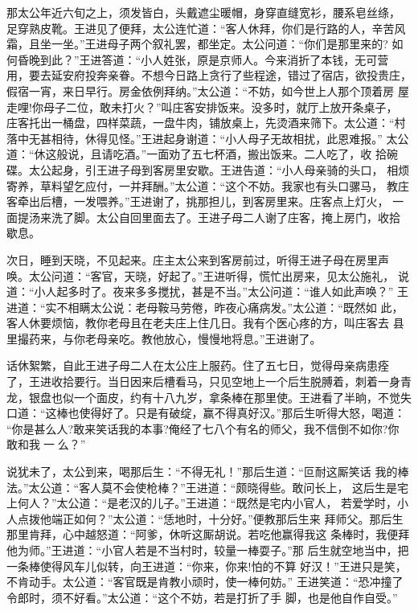 那太公年近六旬之上，须发皆白，头戴遮尘暖帽，身穿直缝宽衫，腰系皂丝绦，
足穿熟皮靴。王进见了便拜，太公连忙道：“客人休拜，你们是行路的人，辛苦风
霜，且坐一坐。”王进母子两个叙礼罢，都坐定。太公问道：“你们是那里来的?
如何昏晚到此？”王进答道：“小人姓张，原是京师人。今来消折了本钱，无可营
用，要去延安府投奔亲眷。不想今日路上贪行了些程途，错过了宿店，欲投贵庄，
假宿一宵，来日早行。房金依例拜纳。”太公道：“不妨，如今世上人那个顶着房
屋走哩!你母子二位，敢未打火？”叫庄客安排饭来。没多时，就厅上放开条桌子，
庄客托出一桶盘，四样菜蔬，一盘牛肉，铺放桌上，先烫酒来筛下。太公道：“村
落中无甚相待，休得见怪。”王进起身谢道：“小人母子无故相扰，此恩难报。”
太公道：“休这般说，且请吃酒。”一面劝了五七杯酒，搬出饭来。二人吃了，收
拾碗碟。太公起身，引王进子母到客房里安歇。王进告道：“小人母亲骑的头口，
相烦寄养，草料望乞应付，一并拜酬。”太公道：“这个不妨。我家也有头口骡马，
教庄客牵出后槽，一发喂养。”王进谢了，挑那担儿，到客房里来。庄客点上灯火，
一面提汤来洗了脚。太公自回里面去了。王进子母二人谢了庄客，掩上房门，收拾
歇息。

次日，睡到天晓，不见起来。庄主太公来到客房前过，听得王进子母在房里声
唤。太公问道：“客官，天晓，好起了。”王进听得，慌忙出房来，见太公施礼，
说道：“小人起多时了。夜来多多搅扰，甚是不当。”太公问道：“谁人如此声唤？”
王进道：“实不相瞒太公说：老母鞍马劳倦，昨夜心痛病发。”太公道：“既然如
此，客人休要烦恼，教你老母且在老夫庄上住几日。我有个医心疼的方，叫庄客去
县里撮药来，与你老母亲吃。教他放心，慢慢地将息。”王进谢了。

话休絮繁，自此王进子母二人在太公庄上服药。住了五七日，觉得母亲病患痊
了，王进收拾要行。当日因来后槽看马，只见空地上一个后生脱膊着，刺着一身青
龙，银盘也似一个面皮，约有十八九岁，拿条棒在那里使。王进看了半晌，不觉失
口道：“这棒也使得好了。只是有破绽，赢不得真好汉。”那后生听得大怒，喝道：
“你是甚么人?敢来笑话我的本事?俺经了七八个有名的师父，我不信倒不如你?你
敢和我一么？”

说犹未了，太公到来，喝那后生：“不得无礼！”那后生道：“叵耐这厮笑话
我的棒法。”太公道：“客人莫不会使枪棒？”王进道：“颇晓得些。敢问长上，
这后生是宅上何人？”太公道：“是老汉的儿子。”王进道：“既然是宅内小官人，
若爱学时，小人点拨他端正如何？”太公道：“恁地时，十分好。”便教那后生来
拜师父。那后生那里肯拜，心中越怒道：“阿爹，休听这厮胡说。若吃他赢得我这
条棒时，我便拜他为师。”王进道：“小官人若是不当村时，较量一棒耍子。”那
后生就空地当中，把一条棒使得风车儿似转，向王进道：“你来，你来!怕的不算
好汉！”王进只是笑，不肯动手。太公道：“客官既是肯教小顽时，使一棒何妨。”
王进笑道：“恐冲撞了令郎时，须不好看。”太公道：“这个不妨，若是打折了手
脚，也是他自作自受。”

